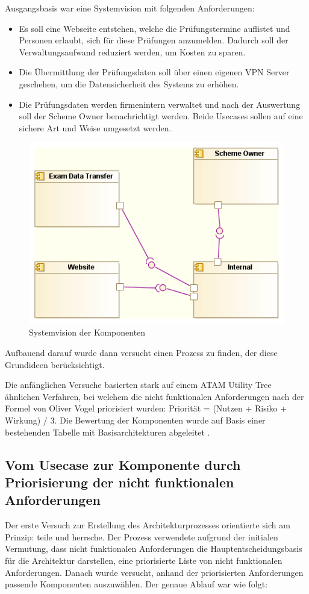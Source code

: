 Ausgangsbasis war eine Systemvision mit folgenden Anforderungen:

\begin{itemize}
  \item Es soll eine Webseite entstehen, welche die Prüfungstermine auflistet und Personen erlaubt, sich für diese Prüfungen anzumelden. Dadurch soll der Verwaltungsaufwand reduziert werden, um Kosten zu sparen.
  \item Die Übermittlung der Prüfungsdaten soll über einen eigenen VPN Server geschehen, um die Datensicherheit des Systems zu erhöhen.
  \item Die Prüfungsdaten werden firmenintern verwaltet und nach der Auswertung soll der Scheme Owner benachrichtigt werden. Beide Usecases sollen auf eine sichere Art und Weise umgesetzt werden.
\end{itemize}

\begin{figure}[!htbp]
    \centering
    \includegraphics[scale=0.6]{uml/vision.png}
    \caption{Systemvision der Komponenten}
\end{figure}

Aufbauend darauf wurde dann versucht einen Prozess zu finden, der diese Grundideen berücksichtigt.

Die anfänglichen Versuche basierten stark auf einem ATAM Utility Tree ähnlichen Verfahren, bei welchem die nicht funktionalen Anforderungen nach der Formel von Oliver Vogel priorisiert wurden: \glqq Priorität = (Nutzen + Risiko + Wirkung) / 3\grqq \cite[S. 374]{softarch}. Die Bewertung der Komponenten wurde auf Basis einer bestehenden Tabelle mit Basisarchitekturen abgeleitet \cite[S. 179]{review}.


\subsection{Vom Usecase zur Komponente durch Priorisierung der nicht funktionalen Anforderungen}
Der erste Versuch zur Erstellung des Architekturprozesses orientierte sich am Prinzip: teile und herrsche. Der Prozess verwendete aufgrund der initialen Vermutung, dass nicht funktionalen Anforderungen die Hauptentscheidungsbasis für die Architektur darstellen, eine priorisierte Liste von nicht funktionalen Anforderungen. Danach wurde versucht, anhand der priorisierten Anforderungen passende Komponenten auszuwählen. Der genaue Ablauf war wie folgt:


